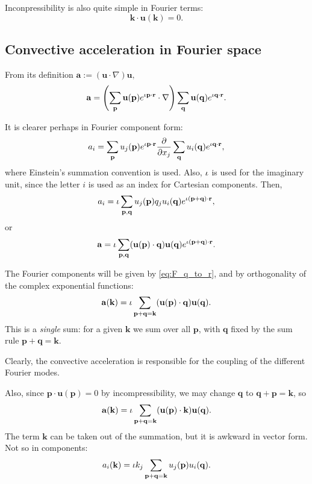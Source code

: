 Inconpressibility is also quite simple in Fourier terms:
\begin{equation*}
	\mathbf{k} \cdot \mathbf{u}(\mathbf{k}) = 0.
\end{equation*}




\subsection{Convective acceleration in Fourier space}

From its definition \(
\mathbf{a} := (\mathbf{u}\cdot\nabla)\mathbf{u} ,
\)
%
\[
\mathbf{a} = 
\left(
\sum_\mathbf{p} \mathbf{u}(\mathbf{p} ) e^{\iota \mathbf{p}\cdot\mathbf{r}} 
\cdot\nabla
\right)
\sum_\mathbf{q} \mathbf{u}(\mathbf{q} ) e^{\iota \mathbf{q}\cdot\mathbf{r}} .
\]

It is clearer perhaps in Fourier component form:
\[
a_i = 
\sum_\mathbf{p} u_j(\mathbf{p} )  e^{\iota \mathbf{p}\cdot\mathbf{r}} 
\frac{\partial}{\partial x_j}
\sum_\mathbf{q} u_i(\mathbf{q} ) e^{\iota \mathbf{q}\cdot\mathbf{r}} ,
\]
where Einstein's summation convention is used. Also, $\iota$ is used
for the imaginary unit, since the letter $i$ is used as an index for
Cartesian components. Then,
\[
a_i = \iota
\sum_{ \mathbf{p}, \mathbf{q}}
u_j(\mathbf{p} )
q_j
u_i(\mathbf{q} )
e^{\iota ( \mathbf{p}  +  \mathbf{q} ) \cdot\mathbf{r}} ,
\]
or
\[
\mathbf{a} = \iota
\sum_{ \mathbf{p}, \mathbf{q}}
(\mathbf{u}(\mathbf{p} )
\cdot
\mathbf{q})
\mathbf{u}(\mathbf{q} )
e^{\iota ( \mathbf{p}  +  \mathbf{q} ) \cdot\mathbf{r}} .
\]

The Fourier components will be given by \eqref{eq:F_q_to_r}, and by orthogonality of the
complex exponential functions:
\[
\mathbf{a}(\mathbf{k})= \iota
\sum_{ \mathbf{p} + \mathbf{q} = \mathbf{k}}
(\mathbf{u}(\mathbf{p} )
\cdot
\mathbf{q})
\mathbf{u}(\mathbf{q} ) .
\]
This is a \emph{single} sum: for a given $\mathbf{k}$ we sum over all $\mathbf{p}$,
with $\mathbf{q}$ fixed by the sum rule $\mathbf{p} + \mathbf{q} = \mathbf{k}$.

Clearly, the convective acceleration is responsible for the coupling of the different Fourier modes.


Also, since $\mathbf{p} \cdot \mathbf{u}(\mathbf{p}) = 0$ by incompressibility, we
may change $\mathbf{q}$ to $\mathbf{q} + \mathbf{p} = \mathbf{k} $,
so
\[
\mathbf{a}(\mathbf{k})=\iota
\sum_{ \mathbf{p} + \mathbf{q} = \mathbf{k}}
(\mathbf{u}(\mathbf{p} )
\cdot
\mathbf{k})
\mathbf{u}(\mathbf{q} ).
\]
The term $\mathbf{k}$ can be taken out of the summation, but it is awkward in vector form. Not so in components:
\[
a_i(\mathbf{k})=\iota
k_j
\sum_{ \mathbf{p} + \mathbf{q} = \mathbf{k}}
u_j (\mathbf{p} )
u_i(\mathbf{q} ) .
\]



